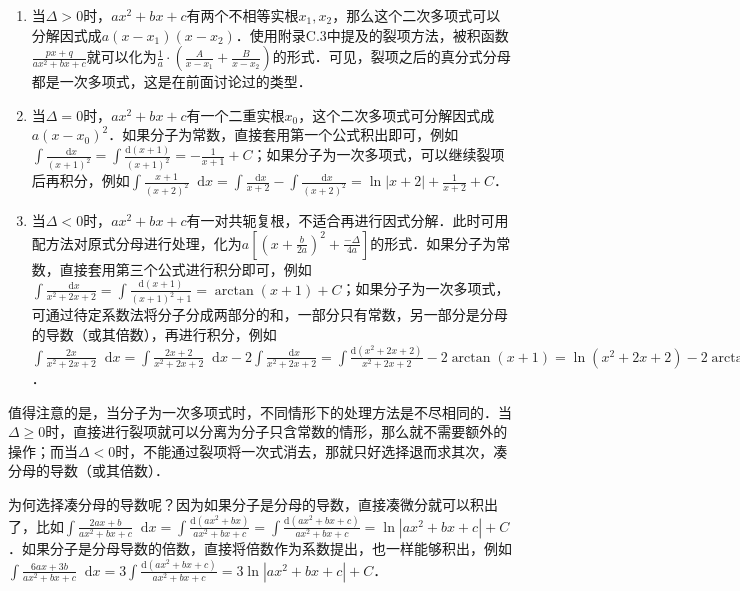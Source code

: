 \documentclass{ctexbook}
\newcommand*{\dif}{\mathop{}\!\mathrm{d}}
\begin{document}
\begin{enumerate}
	\item 当$\Delta>0$时，$ax^{2}+bx+c$有两个不相等实根$x_{1},x_{2}$，那么这个二次多项式可以分解因式成$a\left(x-x_{1}\right)\left(x-x_{2}\right)$．使用附录C.3中提及的裂项方法，被积函数$\frac{px+q}{ax^{2}+bx+c}$就可以化为$\frac{1}{a}\cdot\left(\frac{A}{x-x_{1}}+\frac{B}{x-x_{2}}\right)$的形式．可见，裂项之后的真分式分母都是一次多项式，这是在前面讨论过的类型．
	\item 当$\Delta=0$时，$ax^{2}+bx+c$有一个二重实根$x_{0}$，这个二次多项式可分解因式成$a\left(x-x_{0}\right)^{2}$．如果分子为常数，直接套用第一个公式积出即可，例如$\int\frac{\dif{x}}{\left(x+1\right)^{2}}=\int\frac{\mathrm{d}\left(x+1\right)}{\left(x+1\right)^{2}}=-\frac{1}{x+1}+C$；如果分子为一次多项式，可以继续裂项后再积分，例如$\int\frac{x+1}{\left(x+2\right)^{2}}\dif{x}=\int\frac{\dif{x}}{x+2}-\int\frac{\dif{x}}{\left(x+2\right)^{2}}=\ln{|x+2|}+\frac{1}{x+2}+C$．
	\item 当$\Delta<0$时，$ax^{2}+bx+c$有一对共轭复根，不适合再进行因式分解．此时可用配方法对原式分母进行处理，化为$a\left[\left(x+\frac{b}{2a}\right)^{2}+\frac{-\Delta}{4a}\right]$的形式．如果分子为常数，直接套用第三个公式进行积分即可，例如$\int\frac{\dif{x}}{x^{2}+2x+2}=\int\frac{\mathrm{d}\left(x+1\right)}{\left(x+1\right)^{2}+1}=\arctan{\left(x+1\right)}+C$；如果分子为一次多项式，可通过待定系数法将分子分成两部分的和，一部分只有常数，另一部分是分母的导数（或其倍数），再进行积分，例如$\int\frac{2x}{x^{2}+2x+2}\dif{x}=\int\frac{2x+2}{x^{2}+2x+2}\dif{x}-2\int\frac{\dif{x}}{x^{2}+2x+2}=\int\frac{\mathrm{d}\left(x^{2}+2x+2\right)}{x^{2}+2x+2}-2\arctan{\left(x+1\right)}=\ln{\left(x^{2}+2x+2\right)}-2\arctan{\left(x+1\right)}+C$．
\end{enumerate}\par
值得注意的是，当分子为一次多项式时，不同情形下的处理方法是不尽相同的．当$\Delta\ge0$时，直接进行裂项就可以分离为分子只含常数的情形，那么就不需要额外的操作；而当$\Delta<0$时，不能通过裂项将一次式消去，那就只好选择退而求其次，凑分母的导数（或其倍数）．\par
为何选择凑分母的导数呢？因为如果分子是分母的导数，直接凑微分就可以积出了，比如$\int\frac{2ax+b}{ax^{2}+bx+c}\dif{x}=\int\frac{\mathrm{d}\left(ax^{2}+bx\right)}{ax^{2}+bx+c}=\int\frac{\mathrm{d}\left(ax^{2}+bx+c\right)}{ax^{2}+bx+c}=\ln{|ax^{2}+bx+c|}+C$．如果分子是分母导数的倍数，直接将倍数作为系数提出，也一样能够积出，例如$\int\frac{6ax+3b}{ax^{2}+bx+c}\dif{x}=3\int\frac{\mathrm{d}\left(ax^{2}+bx+c\right)}{ax^{2}+bx+c}=3\ln{|ax^{2}+bx+c|}+C$．\par
\end{document}
